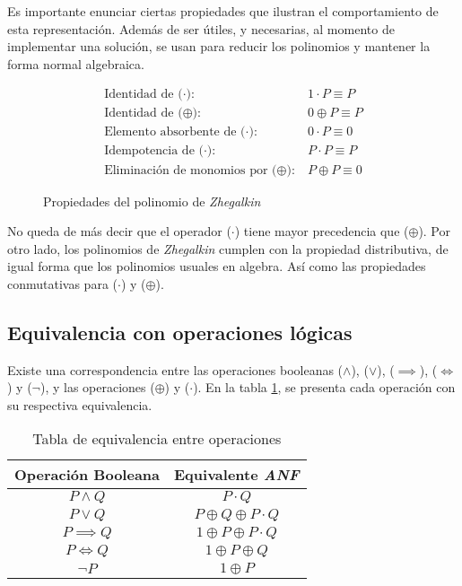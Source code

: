 Es importante enunciar ciertas propiedades que ilustran el comportamiento de esta representación. Además de ser útiles, y necesarias, al momento de implementar una solución, se usan para reducir los polinomios y mantener la forma normal algebraica.

\begin{figure}
\begin{align*}
    \text{Identidad de ($\cdot$):}\ & 1 \cdot P \equiv P\\
    \text{Identidad de ($\oplus$):}\ & 0 \oplus P \equiv P\\
    \text{Elemento absorbente de ($\cdot$):}\ & 0 \cdot P \equiv 0\\
    \text{Idempotencia de ($\cdot$):}\ & P \cdot P \equiv P\\
    \text{Eliminación de monomios por ($\oplus$):}\ & P \oplus P \equiv 0
\end{align*}
\caption{Propiedades del polinomio de \textit{Zhegalkin}}
\label{fig:properties}
\end{figure}

No queda de más decir que el operador ($\cdot$) tiene mayor precedencia que ($\oplus$). Por otro lado, los polinomios de \textit{Zhegalkin} cumplen con la propiedad distributiva, de igual forma que los polinomios usuales en algebra. Así como las propiedades conmutativas para ($\cdot$) y ($\oplus$).

\subsection{Equivalencia con operaciones lógicas}

Existe una correspondencia entre las operaciones booleanas ($\land$), ($\lor$), ($\implies$), ($\iff$) y ($\neg$), y las operaciones ($\oplus$) y ($\cdot$). En la tabla \ref{table:1}, se presenta cada operación con su respectiva equivalencia.

\begin{table}
\centering
\begin{tabular}{|| c | c ||}
 \hline
 Operación Booleana & Equivalente \textit{ANF} \\ [0.1ex]
 \hline\hline
 $P \land Q$ & $P\cdot Q$  \\
 $P \lor Q$ & $P\oplus Q\oplus P\cdot Q$  \\
 $P \implies Q$ & $1\oplus P\oplus P\cdot Q$  \\
 $P \iff Q$ & $1\oplus P\oplus Q$  \\
 $\neg P$ & $1\oplus P$  \\
 \hline
\end{tabular}
\caption{Tabla de equivalencia entre operaciones}
\label{table:1}
\end{table}

